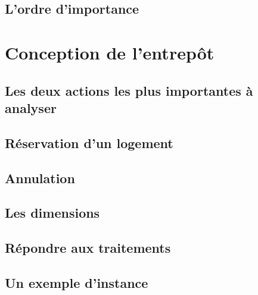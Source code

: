 \documentclass[11pt]{article}
\begin{document}
\subsection{L'ordre d'importance}


\section{Conception de l'entrepôt}
\subsection{Les deux actions les plus importantes à analyser}
\subsection{Réservation d'un logement}

\subsection{Annulation}

\subsection{Les dimensions}

\subsection{Répondre aux traitements}

\subsection{Un exemple d'instance}
\end{document}
